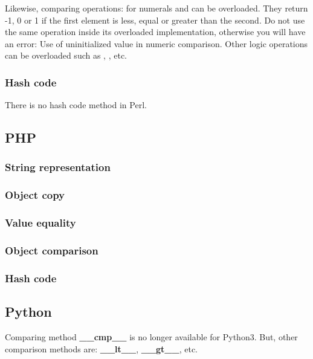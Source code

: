 \documentclass{KodeBook}
\begin{document}
Likewise, comparing operations: \keyword{<=>} for numerals and  can be overloaded. 
They return -1, 0 or 1 if the first element is less, equal or greater than the second.
Do not use the same operation inside its overloaded implementation, otherwise you will have an error: Use of uninitialized value in numeric comparison.
Other logic operations can be overloaded such as \keyword{>}, \keyword{<}, etc.

\subsubsection{Hash code}

There is no hash code method in Perl.

\subsection{PHP}



\subsubsection{String representation}

\subsubsection{Object copy}

\subsubsection{Value equality}

\subsubsection{Object comparison}

\subsubsection{Hash code}

\subsection{Python}



Comparing method \textbf{\_\_cmp\_\_} is no longer available for Python3. 
But, other comparison methods are: \textbf{\_\_lt\_\_}, \textbf{\_\_gt\_\_}, etc.
\end{document}

